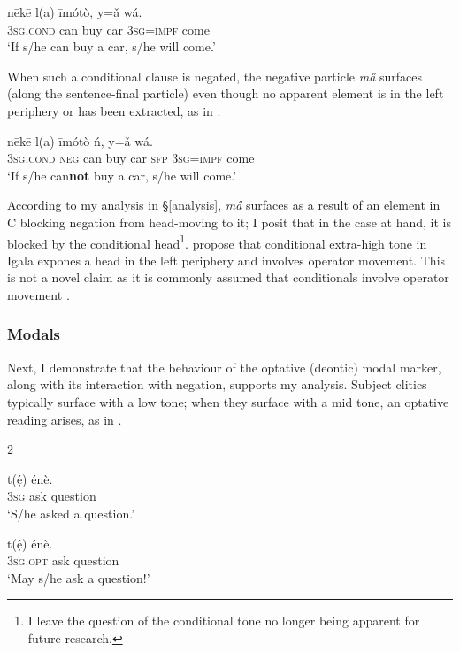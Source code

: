 \documentclass[output=paper,colorlinks,citecolor=brown,
]{langscibook}
\begin{document}
\ea \label{ex:chaperon:cond}
\gll {} nēkē l(a) īmótò, y=ǎ wá.\\
    \textsc{3sg.cond} can buy car \textsc{3sg=impf} come\\
    \glt `If s/he can buy a car, s/he will come.'
\z 

When such a conditional clause is negated, the negative particle \textit{m\H{a}} surfaces (along the sentence-final particle) even though no apparent element is in the left periphery or has been extracted, as in .

\ea \label{ex:chaperon:ncond}
\gll {} 	 	nēkē 	l(a) 	īmótò 	ń, y=ǎ wá.\\     \textsc{3sg.cond} \textsc{neg} can buy car \textsc{sfp} \textsc{3sg=impf} come\\
  \glt   `If s/he can\textbf{not} buy a car, s/he will come.'
\z

According to my analysis in \S\ref{analysis}, \textit{m\H{a}} surfaces as a result of an element in C blocking negation from head-moving to it; I posit that in the case at hand, it is blocked by the conditional head\footnote{I leave the question of the conditional tone no longer being apparent for future research.}. \citet{bolessocolof} propose that conditional extra-high tone in Igala expones a head in the left periphery and involves operator movement. This is not a novel claim as it is commonly assumed that conditionals involve operator movement \citep[{\textit{e.g.,}}][]{haegeman2010movement}.

\subsubsection{Modals}\label{mods}

Next, I demonstrate that the behaviour of the optative (deontic) modal marker, along with its interaction with negation, supports my analysis. Subject clitics typically surface with a low tone; when they surface with a mid tone, an optative reading arises, as in .

\begin{multicols}{2}
\ea \label{ex:chaperon:opt}
\begin{xlist}

\ex\gll {} 		t(\'{ẹ}) 	énè.\\
\textsc{3sg}	ask	question\\
\glt `S/he asked a question.'

\ex\gll {} 		t(\'{ẹ}) 	énè.\\
\textsc{3sg.opt}	ask	question\\
\glt `May s/he ask a question!'

\end{xlist}
\z

\end{multicols}
\end{document}
